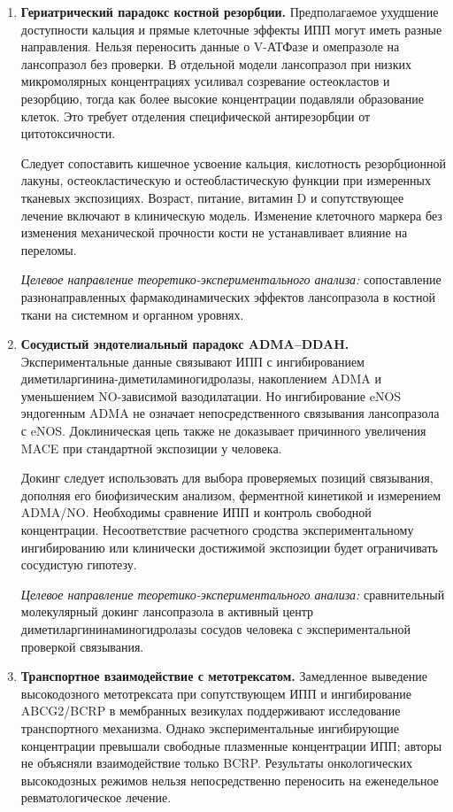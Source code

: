 \documentclass[11pt,a4paper,notitlepage]{report}
\newcommand{\src}[1]{\unskip\space\cite{#1}}
\begin{document}
\begin{enumerate}[label=\textbf{\arabic*.},start=12,leftmargin=*,itemsep=0.9\baselineskip]
\item \textbf{Гериатрический парадокс костной резорбции.} Предполагаемое ухудшение доступности кальция и прямые клеточные эффекты ИПП могут иметь разные направления. Нельзя переносить данные о V-АТФазе и омепразоле на лансопразол без проверки. В отдельной модели лансопразол при низких микромолярных концентрациях усиливал созревание остеокластов и резорбцию, тогда как более высокие концентрации подавляли образование клеток. Это требует отделения специфической антирезорбции от цитотоксичности.\src{futurebone2015,uslabel}

Следует сопоставить кишечное усвоение кальция, кислотность резорбционной лакуны, остеокластическую и остеобластическую функции при измеренных тканевых экспозициях. Возраст, питание, витамин D и сопутствующее лечение включают в клиническую модель. Изменение клеточного маркера без изменения механической прочности кости не устанавливает влияние на переломы.

\textit{Целевое направление теоретико-экспериментального анализа:} сопоставление разнонаправленных фармакодинамических эффектов лансопразола в костной ткани на системном и органном уровнях.

\item \textbf{Сосудистый эндотелиальный парадокс ADMA--DDAH.} Экспериментальные данные связывают ИПП с ингибированием диметиларгинина-диметиламиногидролазы, накоплением ADMA и уменьшением NO-зависимой вазодилатации. Но ингибирование eNOS эндогенным ADMA не означает непосредственного связывания лансопразола с eNOS. Доклиническая цепь также не доказывает причинного увеличения MACE при стандартной экспозиции у человека.\src{futureddah2013,cardiocogent2010}

Докинг следует использовать для выбора проверяемых позиций связывания, дополняя его биофизическим анализом, ферментной кинетикой и измерением ADMA/NO. Необходимы сравнение ИПП и контроль свободной концентрации. Несоответствие расчетного сродства экспериментальному ингибированию или клинически достижимой экспозиции будет ограничивать сосудистую гипотезу.

\textit{Целевое направление теоретико-экспериментального анализа:} сравнительный молекулярный докинг лансопразола в активный центр диметиларгининаминогидролазы сосудов человека с экспериментальной проверкой связывания.

\item \textbf{Транспортное взаимодействие с метотрексатом.} Замедленное выведение высокодозного метотрексата при сопутствующем ИПП и ингибирование ABCG2/BCRP в мембранных везикулах поддерживают исследование транспортного механизма. Однако экспериментальные ингибирующие концентрации превышали свободные плазменные концентрации ИПП; авторы не объясняли взаимодействие только BCRP. Результаты онкологических высокодозных режимов нельзя непосредственно переносить на еженедельное ревматологическое лечение.\src{futuremtx2009,uslabel}


\end{enumerate}
\end{document}
